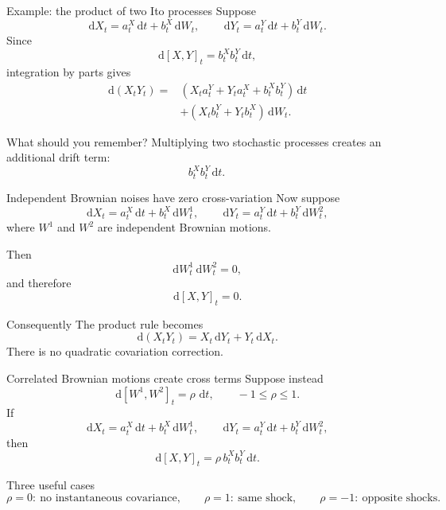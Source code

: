\documentclass[handout,10pt,aspectratio=169]{beamer}
\newcommand{\dd}{\,\mathrm d}
\begin{document}
\begin{frame}{Example: the product of two Ito processes}
Suppose
\[
\dd X_t=a_t^X\dd t+b_t^X\dd W_t,
\qquad
\dd Y_t=a_t^Y\dd t+b_t^Y\dd W_t.
\]
Since
\[
\dd[X,Y]_t=b_t^Xb_t^Y\dd t,
\]
integration by parts gives
\[
\begin{aligned}
\dd(X_tY_t)
={}&
\left(
X_ta_t^Y
+Y_ta_t^X
+b_t^Xb_t^Y
\right)\dd t\\
&+
\left(
X_tb_t^Y
+Y_tb_t^X
\right)\dd W_t.
\end{aligned}
\]

\begin{block}{What should you remember?}
Multiplying two stochastic processes creates an additional drift term:
\[
\boxed{b_t^Xb_t^Y\dd t.}
\]
\end{block}
\end{frame}


\begin{frame}{Independent Brownian noises have zero cross-variation}
Now suppose
\[
\dd X_t=a_t^X\dd t+b_t^X\dd W_t^1,
\qquad
\dd Y_t=a_t^Y\dd t+b_t^Y\dd W_t^2,
\]
where \(W^1\) and \(W^2\) are independent Brownian motions.

Then
\[
\dd W_t^1\dd W_t^2=0,
\]
and therefore
\[
\boxed{\dd[X,Y]_t=0.}
\]

\begin{block}{Consequently}
The product rule becomes
\[
\dd(X_tY_t)=X_t\dd Y_t+Y_t\dd X_t.
\]
There is no quadratic covariation correction.
\end{block}
\end{frame}


\begin{frame}{Correlated Brownian motions create cross terms}
Suppose instead
\[
\dd[W^1,W^2]_t=\rho\,\dd t,
\qquad -1\leq\rho\leq1.
\]
If
\[
\dd X_t=a_t^X\dd t+b_t^X\dd W_t^1,
\qquad
\dd Y_t=a_t^Y\dd t+b_t^Y\dd W_t^2,
\]
then
\[
\boxed{
\dd[X,Y]_t
=
\rho\,b_t^Xb_t^Y\dd t.}
\]

\begin{block}{Three useful cases}
\[
\rho=0:\ \text{no instantaneous covariance},
\qquad
\rho=1:\ \text{same shock},
\qquad
\rho=-1:\ \text{opposite shocks}.
\]
\end{block}
\end{frame}
\end{document}

